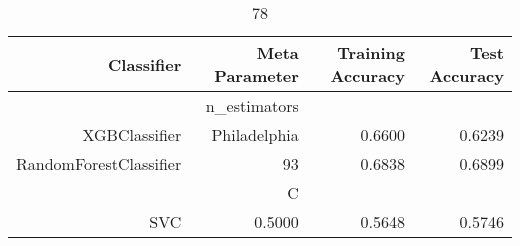 
\begin{table}[H]
    \caption{78}
    \centering
    \begin{tabular}{|r|r|r|r|}
        \hline
        Classifier &Meta Parameter &Training Accuracy
        &Test Accuracy\\
        \hline
        &n\_estimators &\multicolumn{2}{|r|}{}\\
        \hline
        XGBClassifier &Philadelphia &0.6600 &0.6239\\
        \hline
        RandomForestClassifier &93 &0.6838 &0.6899\\
        \hline
        &C &\multicolumn{2}{|r|}{}\\
        \hline
        SVC &0.5000 &0.5648 &0.5746\\
        \hline
    \end{tabular}
\end{table}
